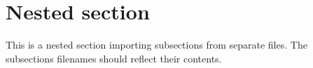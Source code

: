 \section{Nested section}
\label{sec:nested}
\begin{info}
	This is a nested section importing subsections from separate files. The subsections filenames should reflect their contents.
\end{info}




